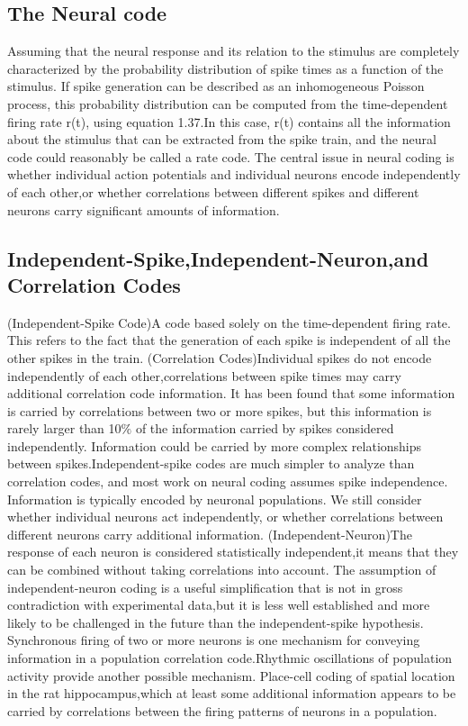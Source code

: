 \documentclass[letterpaper,oneside]{book}
\numberwithin{equation}{chapter}
\theoremstyle{definition}
\begin{document}
\begin{multicols}{2}
\setlength{\columnseprule}{0.2pt}
\section{The Neural code}
\exm Assuming that the neural response and its relation to the stimulus are completely characterized by the probability distribution of spike times as a function of the stimulus. If spike generation can be described as an inhomogeneous Poisson process, this probability distribution can be computed from the time-dependent firing rate r(t), using equation 1.37.In this case, r(t) contains all the information about the stimulus that can be extracted from the spike train, and the neural code could reasonably be called a rate code.
\rem The central issue in neural coding is whether individual action potentials and individual neurons encode independently of each other,or whether correlations between different spikes and different neurons carry significant amounts of information.
\subsection{Independent-Spike,Independent-Neuron,and Correlation Codes}
 (Independent-Spike Code)A code based solely on the time-dependent firing rate. This refers to the fact that the generation of each spike is independent of all the other spikes in the train.
 (Correlation Codes)Individual spikes do not encode independently of each other,correlations between spike times may carry additional correlation code information.
\exm It has been found that some information is carried by correlations between two or more spikes, but this information is rarely larger than 10$\%$ of the information carried by spikes considered independently.
\rem  Information could be carried by more complex relationships between spikes.Independent-spike codes are much simpler to analyze than correlation
codes, and most work on neural coding assumes spike independence.
\ntn  Information is typically encoded by neuronal populations. We still consider whether individual neurons act independently, or whether correlations between different neurons carry additional information.
 (Independent-Neuron)The response of each neuron is considered statistically independent,it means that they can be combined without taking correlations into account.
\rem  The assumption of independent-neuron coding is a useful simplification that is not in gross contradiction with experimental data,but it is less well established and more likely to be challenged in the future than the independent-spike hypothesis.
\ntn Synchronous firing of two or more neurons is one mechanism for conveying information in a population correlation code.Rhythmic oscillations of population activity provide another possible mechanism.
\exm Place-cell coding of spatial location in the rat hippocampus,which at least some additional information appears to be carried by correlations between the firing patterns of neurons in a population.

\end{multicols}
\end{document}
